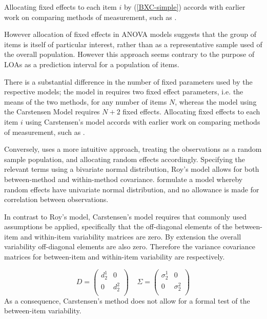 \documentclass[12pt, a4paper]{report}
\theoremstyle{plain}
\theoremstyle{definition}
\theoremstyle{remark}
\begin{document}

Allocating fixed effects to each item $i$ by (\ref{BXC-simple}) accords with earlier work on comparing methods of measurement, such as \citet{Grubbs48}.

However allocation of fixed effects in ANOVA models suggests that the group of items is itself of particular interest, rather than as a representative sample used of the overall population. However this approach seems contrary to the purpose of LOAs as a prediction interval for a population of items.

There is a substantial difference in the number of fixed parameters used by the respective models; the model in \citet{ARoy2009} requires two fixed effect parameters, i.e. the means of the two methods, for any number of items $N$, whereas the model using the Carstensen Model requires $N+2$ fixed effects. Allocating fixed effects to each item $i$ using Carstensen's model accords with earlier work on comparing methods of measurement, such as \citet{Grubbs48}.

Conversely, \citet{ARoy2009} uses a more intuitive approach, treating the observations as a random sample population, and allocating random effects accordingly. Specifying the relevant terms using a bivariate normal distribution, Roy's model allows for both between-method and within-method covariance. \citet{BXC2008} formulate a model whereby random effects have univariate normal distribution, and no allowance is made for correlation between observations.

In contrast to Roy's model, Carstensen's model requires that commonly used assumptions be applied, specifically that the off-diagonal elements of the between-item and within-item variability matrices are zero. By extension the overall variability off-diagonal elements are also zero. Therefore the variance covariance matrices for
between-item and within-item variability are respectively.

\[{D} = \left(
\begin{array}{cc}
d^1_2  & 0 \\
0 & d^2_2 \\
\end{array}
\right) \;\;\;\; {\Sigma} = \left(
\begin{array}{cc}
\sigma^1_2  & 0 \\
0 & \sigma^2_2 \\
\end{array}
\right) \]
As a consequence, Carstensen's method does not allow for a formal test of the between-item variability.
\end{document}
